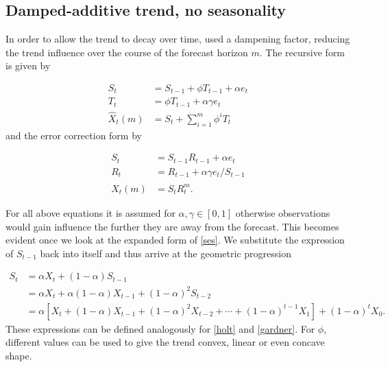\subsection*{Damped-additive trend, no seasonality}

In order to allow the trend to decay over time, \citet{gardner1989note} used a dampening factor, reducing the trend influence over the course of the forecast horizon $m$. The recursive form is given by 

\begin{equation}
	\label{gardner}
	\begin{array}{rl}
		S_{t}&=S_{t-1}+\phi T_{t-1}+\alpha e_{t} \\
		T_{t}&=\phi T_{t-1}+\alpha \gamma e_{t} \\
		\hat{X}_{t}(m)&=S_{t}+\sum_{i=1}^{m} \phi^{i} T_{t}
	\end{array}
\end{equation}
%
and the error correction form by

\begin{equation}
	\begin{array}{rl}
		S_{t}&=S_{t-1} R_{t-1}+\alpha e_{t} \\
		R_{t}&=R_{t-1}+\alpha \gamma e_{t} / S_{t-1} \\
		\hat{X}_{t}(m)&=S_{t} R_{t}^{m}.
	\end{array}
\end{equation}

For all above equations it is assumed for $\alpha, \gamma \in [0,1]$ otherwise observations would gain influence the further they are away from the forecast. This becomes evident once we look at the expanded form of \ref{ses}. We substitute the expression of $S_{t-1}$ back into itself and thus arrive at the geometric progression 

\begin{equation*}
	\begin{aligned}
		S_{t} &=\alpha X_{t}+(1-\alpha) S_{t-1} \\
		&=\alpha X_{t}+\alpha(1-\alpha) X_{t-1}+(1-\alpha)^{2} S_{t-2} \\
		&=\alpha\left[X_{t}+(1-\alpha) X_{t-1}+(1-\alpha)^{2} X_{t-2}+\cdots+(1-\alpha)^{t-1} X_{1}\right]+(1-\alpha)^{t} X_{0} .
	\end{aligned}
\end{equation*}
%
These expressions can be defined analogously for \ref{holt} and \ref{gardner}. For $\phi$, different values can be used to give the trend convex, linear or even concave shape. 

